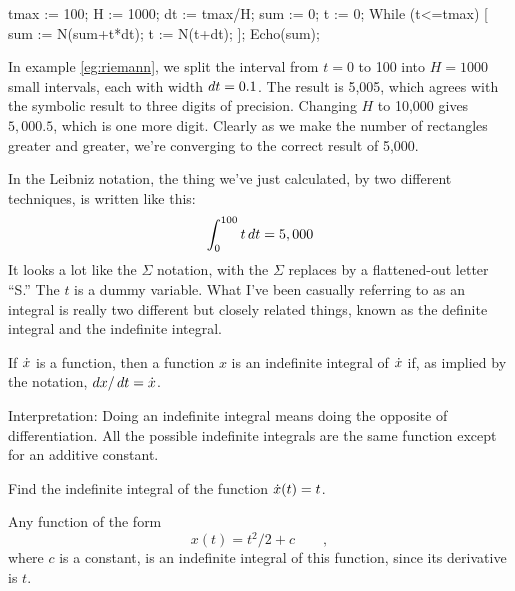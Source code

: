 
\restartLineNumbers
\begin{eg}\label{eg:riemann}
\startcodeeg
\begin{Code}
  \nn tmax := 100;
  \nn H := 1000;
  \nn dt := tmax/H;
  \nn sum := 0;
  \nn t := 0;
  \nn While (t<=tmax) [
  \nn   sum := N(sum+t*dt);
  \nn   t := N(t+dt);
  \nn ];
  \nn Echo(sum);
\end{Code}
\end{eg}

In example \ref{eg:riemann}, we split the interval from $t=0$ to 100 into $H=1000$ small
intervals, each with width $\mathop{d\!} t=0.1$. The result is 5,005, which agrees with the symbolic
result to three digits of precision. Changing $H$ to 10,000 gives $5,000.5$, which is one
more digit. Clearly as we make the number of rectangles greater and greater, we're converging
to the correct result of 5,000.

In the Leibniz notation,
the thing we've just calculated, by two different techniques, is written like
this:
\begin{equation*}
  \int_{0}^{100} t \mathop{d\!} t = 5,000
\end{equation*}
It looks a lot like the $\Sigma$ notation, with the $\Sigma$ replaces by a flattened-out letter ``S.''
The $t$ is a dummy variable. What I've been casually referring to as an integral is really two different
but closely related things, known as the definite integral and the indefinite integral.

\begin{important}
If $\dot{x}$ is a function, then a function $x$ is an indefinite integral of $\dot{x}$ if,
as implied by the notation, $\mathop{d\!} x/\mathop{d\!} t=\dot{x}$.

Interpretation: Doing an indefinite integral means doing the opposite of differentiation.
All the possible indefinite integrals are the same function except for an additive constant.
\end{important}

\begin{eg}
\egquestion Find the indefinite integral of the function $\dot{x}(t)=t$.

\eganswer Any function of the form
\begin{equation*}
  x(t)=t^2/2+c \qquad ,
\end{equation*}
where $c$ is a constant, is an
indefinite integral of this function, since its derivative is $t$.
\end{eg}

